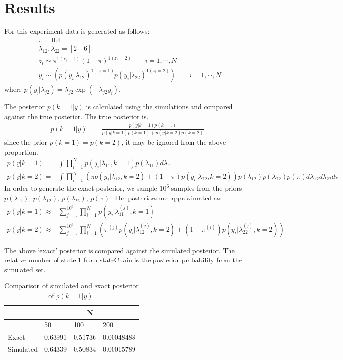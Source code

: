 \documentclass{article}
\begin{document}
\clearpage
\section{Results}
For this experiment data is generated as follows:
\begin{align*}
& \pi =  0.4 \\
& \lambda_{12},\lambda_{22} =  [2\quad 6] \\
& z_i \sim \pi^{1(z_i=1)}(1-\pi)^{1(z_i=2)}\qquad i=1,\cdots,N\\
& y_i \sim (p(y_i|\lambda_{12})^{1(z_i=1)}p(y_i|\lambda_{22})^{1(z_i=2)})\qquad i=1,\cdots,N
\end{align*}
where $p(y_i|\lambda_{j2})=\lambda_{j2}\exp(-\lambda_{j2}y_i)$.

The posterior $p(k=1|y)$ is calculated using the simulations and compared against the true posterior. The true posterior is,
\begin{align}
p(k=1|y)=&\frac{p(y|k=1)p(k=1)}{p(y|k=1)p(k=1)+p(y|k=2)p(k=2)}
\end{align}
since the prior $p(k=1)=p(k=2)$, it may be ignored from the above proportion.
\begin{align*}
p(y|k=1)=& \int \prod_{i=1}^{N}p(y_i|\lambda_{11},k=1)p(\lambda_{11}) d\lambda_{11}\\
p(y|k=2)=& \int \prod_{i=1}^{N}\left(\pi p(y_i|\lambda_{12},k=2)+(1-\pi)p(y_i|\lambda_{22},k=2)\right)p(\lambda_{12})p(\lambda_{22})p(\pi) d\lambda_{12}d\lambda_{22}d\pi
\end{align*}
In order to generate the exact posterior, we sample $10^6$ samples from the priors $p(\lambda_{11})$, $p(\lambda_{12})$, $p(\lambda_{22})$, $p(\pi)$. The posteriors are approximated as:
\begin{align}
p(y|k=1)\approx &\sum_{j=1}^{10^6}\prod_{i=1}^{N}p(y_i|\lambda_{11}^{(j)},k=1)\\
p(y|k=2)\approx & \sum_{j=1}^{10^6} \prod_{i=1}^{N}\left(\pi^{(j)} p(y_i|\lambda_{12}^{(j)},k=2)+(1-\pi^{(j)})p(y_i|\lambda_{22}^{(j)},k=2)\right)
\end{align}

The above `exact' posterior is compared against the simulated posterior. The relative number of state 1 from stateChain is the posterior probability from the simulated set.

\begin{table}[h]
\centering
\begin{tabular}{llll}
\hline
& \multicolumn{3}{c}{N}\\
\hline
& 50 & 100 & 200 \\
\hline
Exact & 0.63991 & 0.51736 & 0.00048488\\
Simulated & 0.64339 & 0.50834 & 0.00015789\\
\hline
\end{tabular}
\caption{Comparison of simulated and exact posterior of $p(k=1|y)$.}
\end{table}
\end{document}
